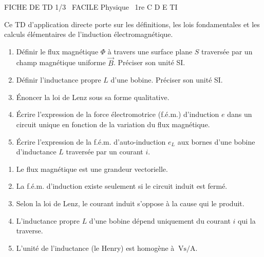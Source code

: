 \documentclass[11pt]{article}
\begin{document}
\begin{tcolorbox}[enhanced,colback=popink,colframe=popink,arc=10pt,boxrule=0pt,left=12pt,right=12pt,top=9pt,bottom=9pt]
{\color{white}\popxbold\small FICHE DE TD 1/3 \textbullet\ FACILE \hfill Physique \textbullet\ 1re C D E TI\par}
\end{tcolorbox}
\vspace{4pt}
Ce TD d'application directe porte sur les définitions, les lois fondamentales et les calculs élémentaires de l'induction électromagnétique.

\begin{exercice}
\begin{enumerate}
    \item Définir le flux magnétique $\Phi$ à travers une surface plane $S$ traversée par un champ magnétique uniforme $\vec{B}$. Préciser son unité SI.
    \item Définir l'inductance propre $L$ d'une bobine. Préciser son unité SI.
    \item Énoncer la loi de Lenz sous sa forme qualitative.
    \item Écrire l'expression de la force électromotrice (f.é.m.) d'induction $e$ dans un circuit unique en fonction de la variation du flux magnétique.
    \item Écrire l'expression de la f.é.m. d'auto-induction $e_L$ aux bornes d'une bobine d'inductance $L$ traversée par un courant $i$.
\end{enumerate}
\end{exercice}

\begin{exercice}
\begin{enumerate}
    \item Le flux magnétique est une grandeur vectorielle.
    \item La f.é.m. d'induction existe seulement si le circuit induit est fermé.
    \item Selon la loi de Lenz, le courant induit s'oppose à la cause qui le produit.
    \item L'inductance propre $L$ d'une bobine dépend uniquement du courant $i$ qui la traverse.
    \item L'unité de l'inductance (le Henry) est homogène à $\SI{}{\volt\second\per\ampere}$.
\end{enumerate}
\end{exercice}
\end{document}
